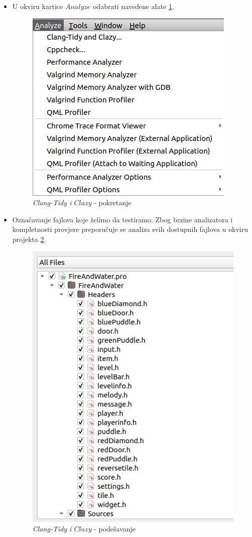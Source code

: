 \documentclass[a4paper]{article}
\begin{document}
\begin{itemize}
	\item U okviru kartice $Analyze$ odabrati navedene alate \ref{fig:cc1}.
	\begin{figure}
		\centering
		\caption{\textit{\textit{Clang-Tidy} i $Clazy$} - pokretanje}
		\label{fig:cc1}
		\includegraphics[scale=0.4]{cc1.png}
	\end{figure}
	\item Označavanje fajlova koje želimo da testiramo. Zbog brzine analizatora i kompletnosti provjere preporučuje se analiza svih dostupnih fajlova u okviru projekta \ref{fig:cc2}.
	\begin{figure}[h!]
		\centering
		\caption{\textit{\textit{Clang-Tidy} i $Clazy$} - podešavanje}
		\label{fig:cc2}
		\includegraphics[scale=0.4]{cc2.png}
	\end{figure}
\end{itemize}
\end{document}

